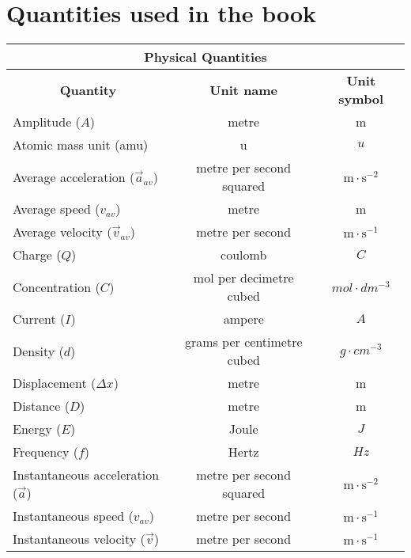 \section{Quantities used in the book}
\begin{table}[H]
\begin{center}
\begin{tabular}{|l|c|c|}\hline \hline 
\multicolumn{3}{|c|}{\textbf{Physical Quantities}}\\ \hline \hline
\multicolumn{1}{|c|}{\textbf{Quantity}} & \textbf{Unit name} & \textbf{Unit symbol}\\ \hline
Amplitude ($A$)             & metre & m                              \\ \hline
Atomic mass unit (amu)               & u & $u$  \\ \hline
Average acceleration ($\vec{a}_{av}$)  & metre per second squared & $\text{m} \cdot \text{s}^{-2}$  \\ \hline
Average speed ($v_{av}$)        & metre & m                               \\ \hline
Average velocity ($\vec{v}_{av}$)  & metre per second & $\text{m} \cdot \text{s}^{-1}$  \\ \hline
Charge ($Q$)             & coulomb                   &  $C$                \\ \hline
Concentration ($C$)             & mol per decimetre cubed & $mol \cdot dm^{-3}$  \\ \hline
Current ($I$)             & ampere & $A$                             \\ \hline
Density ($d$)                & grams per centimetre cubed & $g \cdot cm^{-3}$           \\ \hline
Displacement ($\Delta x$)      & metre  & m                                \\ \hline
Distance ($D$)             & metre & m                               \\ \hline
Energy ($E$)             & Joule & $J$ \\ \hline
Frequency ($f$)             & Hertz &  $Hz$   \\ \hline
Instantaneous acceleration ($\vec{a}$)  & metre per second squared & $\text{m} \cdot \text{s}^{-2}$ \\ \hline
Instantaneous speed (${v}_{av}$)      & metre per second & $\text{m} \cdot \text{s}^{-1}$  \\ \hline
Instantaneous velocity ($\vec{v}$)       & metre per second & $\text{m} \cdot \text{s}^{-1}$  \\ \hline

\end{tabular}
\end{center}
\end{table}
